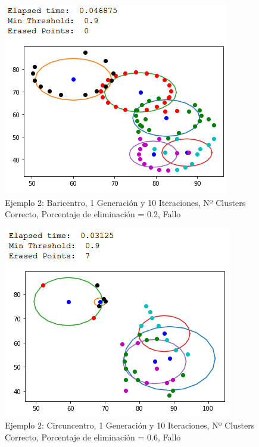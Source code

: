 \documentclass[conference,a4paper]{IEEEtran}
\begin{document}
\begin{figure}[H]
\centering
\includegraphics[scale=0.65]{Experimentacion/Ejemplo2/ej2_b_1_10_le_wrong}
\caption{Ejemplo 2: Baricentro, 1 Generación y 10 Iteraciones,  Nº Clusters Correcto, Porcentaje de eliminación = 0.2, Fallo\\}
\end{figure}

\begin{figure}[H]
\centering
\includegraphics[scale=0.65]{Experimentacion/Ejemplo2/ej2_c_1_10_me_wrong}
\caption{Ejemplo 2: Circuncentro, 1 Generación y 10 Iteraciones,  Nº Clusters Correcto, Porcentaje de eliminación = 0.6, Fallo\\}
\end{figure}
\end{document}
